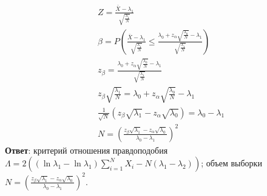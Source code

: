 \documentclass{assignment}
\begin{document}
\begin{enumerate}
\begin{align*}
        &Z = \frac{\bar{X} - \lambda_1}{\sqrt{\frac{\lambda_1}{N}}} \\
        &\beta = P(\frac{\bar{X} - \lambda_1}{\sqrt{\frac{\lambda_1}{N}}} \leq \frac{\lambda_0 + z_{\alpha}\sqrt{\frac{\lambda_0}{N}}-\lambda_1}{\sqrt{\frac{\lambda_1}{N}}}) \\
        &z_{\beta} = \frac{\lambda_0 + z_{\alpha}\sqrt{\frac{\lambda_0}{N}}-\lambda_1}{\sqrt{\frac{\lambda_1}{N}}} \\
        &z_{\beta}\sqrt{\frac{\lambda_1}{N}} = \lambda_0 + z_{\alpha}\sqrt{\frac{\lambda_0}{N}}-\lambda_1 \\
        &\frac{1}{\sqrt{N}}(z_{\beta}\sqrt{\lambda_1} - z_{\alpha}\sqrt{\lambda_0}) = \lambda_0 - \lambda_1 \\
        &N = \left(\frac{z_{\beta}\sqrt{\lambda_1} - z_{\alpha}\sqrt{\lambda_0}}{\lambda_0 - \lambda_1}\right)^2
    \end{align*}
    \textbf{Ответ}: критерий отношения правдоподобия $\Lambda = 2((\ln\lambda_1 - \ln\lambda_1)\sum_{i=1}^{N} X_i - N(\lambda_1 - \lambda_2))$; объем выборки $N = \left(\frac{z_{\beta}\sqrt{\lambda_1} - z_{\alpha}\sqrt{\lambda_0}}{\lambda_0 - \lambda_1}\right)^2$.
    \finish

    


\end{enumerate}
\end{document}
